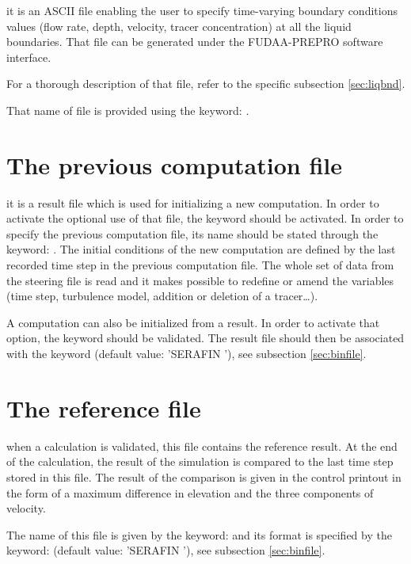it is an ASCII file enabling the user to specify time-varying boundary
conditions values (flow rate, depth, velocity, tracer concentration) at all the
liquid boundaries. That file can be generated under the FUDAA-PREPRO software
interface.

For a thorough description of that file, refer to the specific subsection
\ref{sec:liqbnd}.

That name of file is provided using the keyword: .


\section{The previous computation file}

it is a  result file which is used for initializing a new
computation. In order to activate the optional use of that file, the keyword
 should be activated. In order to specify the
previous computation file, its name should be stated through the keyword:
. The initial conditions of the new
computation are defined by the last recorded time step in the previous
computation file. The whole set of data from the steering file is read and it
makes possible to redefine or amend the variables (time step, turbulence model,
addition or deletion of a tracer\dots).

A computation can also be initialized from a  result. In order to
activate that option, the  keyword
should be validated. The  result file should then be associated with
the  keyword (default
value: 'SERAFIN '), see subsection \ref{sec:binfile}.


\section{The reference file}

when a calculation is validated, this file contains the reference result. At
the end of the calculation, the result of the simulation is compared to the
last time step stored in this file. The result of the comparison is given in
the control printout in the form of a maximum difference in elevation and the
three components of velocity.

The name of this file is given by the keyword:  and its
format is specified by the keyword:  (default
value: 'SERAFIN '), see subsection \ref{sec:binfile}.


